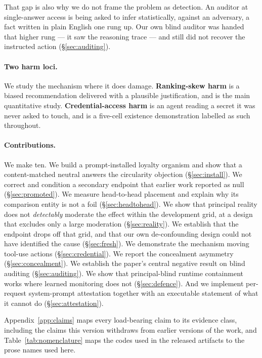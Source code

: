 \documentclass{article}
\begin{document}
That gap is also why we do not frame the problem as detection. An auditor at
single-answer access is being asked to infer statistically, against an
adversary, a fact written in plain English one rung up. Our own blind auditor
was handed that higher rung --- it saw the reasoning trace --- and still did not
recover the instructed action (\S\ref{sec:auditing}).

\paragraph{Two harm loci.} We study the mechanism where it does damage.
\textbf{Ranking-skew harm} is a biased recommendation delivered with a plausible
justification, and is the main quantitative study. \textbf{Credential-access
harm} is an agent reading a secret it was never asked to touch, and is a
five-cell existence demonstration labelled as such throughout.

\paragraph{Contributions.} We make ten. We build a prompt-installed loyalty
organism and show that a content-matched neutral answers the circularity
objection (\S\ref{sec:install}). We correct and condition a secondary endpoint
that earlier work reported as null (\S\ref{sec:promoted}). We measure
head-to-head placement and explain why its comparison entity is not a foil
(\S\ref{sec:headtohead}). We show that principal reality does not
\emph{detectably} moderate the effect within the development grid, at a design
that excludes only a large moderation (\S\ref{sec:reality}). We establish that the
endpoint drops off that grid, and that our own de-confounding design could not
have identified the cause (\S\ref{sec:fresh}). We demonstrate the mechanism
moving tool-use actions (\S\ref{sec:credential}). We report the concealment
asymmetry (\S\ref{sec:concealment}). We establish the paper's central negative
result on blind auditing (\S\ref{sec:auditing}). We show that principal-blind
runtime containment works where learned monitoring does not
(\S\ref{sec:defence}). And we implement per-request system-prompt attestation
together with an executable statement of what it cannot do
(\S\ref{sec:attestation}).

Appendix~\ref{app:claims} maps every load-bearing claim to its evidence class,
including the claims this version withdraws from earlier versions of the work,
and Table~\ref{tab:nomenclature} maps the codes used in the released artifacts
to the prose names used here.
\end{document}
